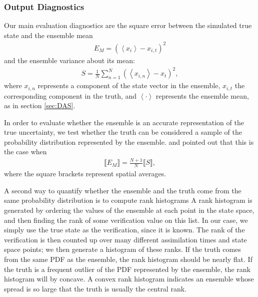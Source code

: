 \subsubsection{Output Diagnostics}
Our main evaluation diagnostics are the square error between the simulated true state and the ensemble mean
\begin{eqnarray}
E_M = \left(
\left< x_i \right>-x_{i,t}
\right)^2
\end{eqnarray}
and the ensemble variance about its mean:
\begin{eqnarray}
S = 
\frac{1}{N}
\sum_{n=1}^N
\left(
\left< x_{i,n} \right>-x_t
\right)^2,
\end{eqnarray}
where $x_{i,n}$ represents a component of the state vector in the ensemble,  $x_{i,t}$ the corresponding component in the truth, and $\left< \cdot \right>$ represents the ensemble mean, as in section \ref{sec:DAS}.

In order to evaluate whether the ensemble is an accurate representation of the true uncertainty, we  test whether the truth can be considered a sample of the probability distribution represented by the ensemble.
 \citet{Huntley2009} and \citet{Murphy1988} pointed out that this is the case when 
\begin{eqnarray}
\llbracket E_M \rrbracket = \frac{N+1}{N} \llbracket S \rrbracket, 
\label{eq:EvsS}
\end{eqnarray}
where the square brackets represent spatial averages. 

A second way to quantify whether the ensemble and the truth come from the same probability distribution is to compute rank histograms \citep[and references therein]{Hamill2001}
A rank histogram is generated by ordering the values of the ensemble at each point in the state space, and then finding the rank of some verification value on this list.
In our case, we simply use the true state as the verification, since it is known.
The rank of the verification is then counted up over many different assimilation times and state space points; we then generate a histogram of these ranks.
If the truth comes from the same PDF as the ensemble, the rank histogram should be nearly flat.  
If the truth is a frequent outlier of the PDF represented by the ensemble, the rank histogram will by concave.
A convex rank histogram indicates an ensemble whose spread is so large that the truth is usually the central rank. 

